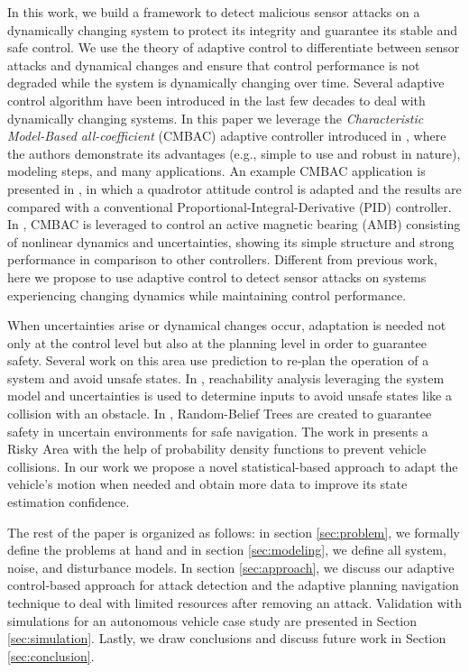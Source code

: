 In this work, we build a framework to detect malicious sensor attacks on a dynamically changing system to protect its integrity and guarantee its stable and safe control. We use the theory of adaptive control to differentiate between sensor attacks and dynamical changes and ensure that control performance is not degraded while the system is dynamically changing over time. Several adaptive control algorithm have been introduced in the last few decades to deal with dynamically changing systems. In this paper we leverage the \textit{Characteristic Model-Based all-coefficient} (CMBAC) adaptive controller introduced in \cite{4106038}, where the authors demonstrate its advantages (e.g., simple to use and robust in nature), modeling steps, and many applications. An example CMBAC application is presented in \cite{7578288}, in which a quadrotor attitude control is adapted and the results are compared with a conventional Proportional-Integral-Derivative (PID) controller. In \cite{Di2014}, CMBAC is leveraged to control an active magnetic bearing (AMB) consisting of nonlinear dynamics and uncertainties, showing its simple structure and strong performance in comparison to other controllers. Different from previous work, here we propose to use adaptive control to detect sensor attacks on systems experiencing changing dynamics while maintaining control performance.






When uncertainties arise or dynamical changes occur, adaptation is needed not only at the control level but also at the planning level in order to guarantee safety. Several work on this area use prediction to re-plan the operation of a system and avoid unsafe states. In \cite{8463205}, reachability analysis leveraging the system model and uncertainties is used to determine inputs to avoid unsafe states like a collision with an obstacle. In \cite{5980508}, Random-Belief Trees are created to guarantee safety in uncertain environments for safe navigation. The work in \cite{6934041} presents a Risky Area with the help of probability density functions to prevent vehicle collisions. In our work we propose a novel statistical-based approach to adapt the vehicle's motion when needed and obtain more data to improve its state estimation confidence.

The rest of the paper is organized as follows: in section \ref{sec:problem}, we formally define the problems at hand and in section \ref{sec:modeling}, we define all system, noise, and disturbance models. In section \ref{sec:approach}, we discuss our adaptive control-based approach for attack detection and the adaptive planning navigation technique to deal with limited resources after removing an attack. Validation with simulations for an autonomous vehicle case study are presented in Section \ref{sec:simulation}. Lastly, we draw conclusions and discuss future work in Section \ref{sec:conclusion}.


